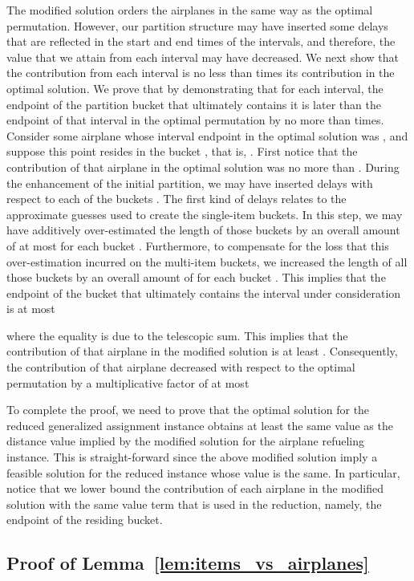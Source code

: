 \documentclass[11pt]{article}
\theoremstyle{plain}
\theoremstyle{definition}
\begin{document}
The modified solution orders the airplanes in the same way as the optimal permutation. However, our partition structure may have inserted some delays that are reflected in the start and end times of the intervals, and therefore, the value that we attain from each interval may have decreased. We next show that the contribution from each interval is no less than  times its contribution in the optimal solution. We prove that by demonstrating that for each interval, the endpoint of the partition bucket that ultimately contains it is later than the endpoint of that interval in the optimal permutation by no more than  times. Consider some airplane  whose interval endpoint in the optimal solution was , and suppose this point resides in the bucket , that is, . First notice that the contribution of that airplane in the optimal solution was no more than . During the enhancement of the initial partition, we may have inserted delays with respect to each of the buckets . The first kind of delays relates to the approximate guesses used to create the single-item buckets. In this step, we may have additively over-estimated the length of those buckets by an overall amount of at most  for each bucket . Furthermore, to compensate for the loss that this over-estimation incurred on the multi-item buckets, we increased the length of all those buckets by an overall amount of  for each bucket . This implies that the endpoint of the bucket that ultimately contains the interval under consideration is at most

where the equality is due to the telescopic sum. This implies that the contribution of that airplane in the modified solution is at least . Consequently, the contribution of that airplane decreased with respect to the optimal permutation by a multiplicative factor of at most


To complete the proof, we need to prove that the optimal solution for the reduced generalized assignment instance obtains at least the same value as the distance value implied by the modified solution for the airplane refueling instance. This is straight-forward since the above modified solution imply a feasible solution for the reduced instance whose value is the same. In particular, notice that we lower bound the contribution of each airplane in the modified solution with the same value term that is used in the reduction, namely, the endpoint of the residing bucket.

\subsection{Proof of Lemma~\ref{lem:items_vs_airplanes}}
\end{document}
